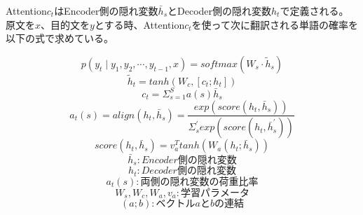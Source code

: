 \documentclass[dvipdfmx,12pt,report]{jsbook}
\begin{document}
Attention$c_t$はEncoder側の隠れ変数$\bar{h}_s$とDecoder側の隠れ変数$h_t$で定義される。
原文を$x$、目的文を$y$とする時、Attention$c_t$を使って次に翻訳される単語の確率を以下の式で求めている。

$$p(y_t\mid y_1, y_2, \cdots, y_{t-1}, x)=softmax(W_s\cdot \tilde{h}_s)$$
$$\tilde{h}_t=tanh(W_c,[c_t;h_t])$$
$$c_t=\Sigma_{s=1}^S a(s)\bar{h}_s$$
$$a_t(s)=align(h_t,\bar{h}_s)=\frac{exp(score(h_t,\bar{h}_s))}{\Sigma_s^{'} exp(score(h_t,\bar{h}_s^{'}))}$$
$$score(h_t,\bar{h}_s)=v_a^T tanh(W_a(h_t;\bar{h}_s))$$
$$\bar{h}_s : Encoder側の隠れ変数$$
$$h_t : Decoder側の隠れ変数$$
$$a_t(s) : 両側の隠れ変数の荷重比率$$
$$W_s,W_c,W_a,v_a : 学習パラメータ$$
$$(a;b) : ベクトルaとbの連結$$



% 
% 



\end{document}
